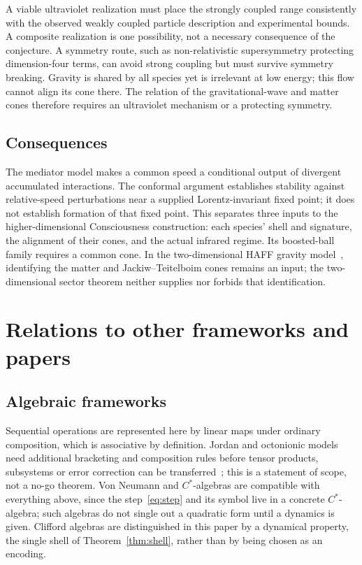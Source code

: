 \documentclass[12pt]{article}
\theoremstyle{definition}
\theoremstyle{remark}
\begin{document}
A viable ultraviolet realization must place the strongly coupled range consistently with the observed weakly coupled particle description and experimental bounds. A composite realization is one possibility, not a necessary consequence of the conjecture. A symmetry route, such as non-relativistic supersymmetry protecting dimension-four terms, can avoid strong coupling but must survive symmetry breaking. Gravity is shared by all species yet is irrelevant at low energy; this flow cannot align its cone there. The relation of the gravitational-wave and matter cones therefore requires an ultraviolet mechanism or a protecting symmetry.

\subsection{Consequences}

The mediator model makes a common speed a conditional output of divergent accumulated interactions. The conformal argument establishes stability against relative-speed perturbations near a supplied Lorentz-invariant fixed point; it does not establish formation of that fixed point. This separates three inputs to the higher-dimensional Consciousness construction: each species' shell and signature, the alignment of their cones, and the actual infrared regime. Its boosted-ball family requires a common cone. In the two-dimensional HAFF gravity model~\cite{Liu2026HAFFD}, identifying the matter and Jackiw--Teitelboim cones remains an input; the two-dimensional sector theorem neither supplies nor forbids that identification.

\section{Relations to other frameworks and papers}
\label{sec:relations}

\subsection{Algebraic frameworks}

Sequential operations are represented here by linear maps under ordinary composition, which is associative by definition. Jordan and octonionic models need additional bracketing and composition rules before tensor products, subsystems or error correction can be transferred~\cite{Schafer1966,Gunaydin1973,AlfsenShultz2003}; this is a statement of scope, not a no-go theorem. Von Neumann and $C^*$-algebras are compatible with everything above, since the step~\eqref{eq:step} and its symbol live in a concrete $C^*$-algebra; such algebras do not single out a quadratic form until a dynamics is given. Clifford algebras are distinguished in this paper by a dynamical property, the single shell of Theorem~\ref{thm:shell}, rather than by being chosen as an encoding.
\end{document}
